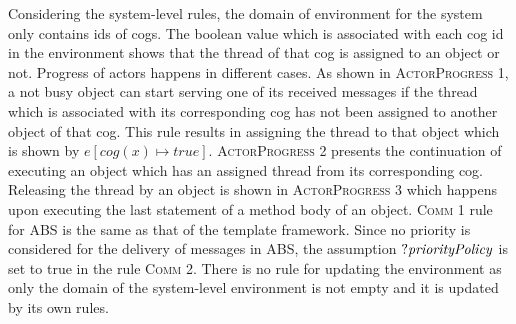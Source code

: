 Considering the system-level rules, the domain of environment for the system only contains ids of cogs. The boolean value which is associated with each cog id in the environment shows that the thread of that cog is assigned to an object or not.  Progress of actors happens in different cases. As shown in \textsc{ActorProgress 1}, a not busy object can start serving one of its received messages if the thread which is associated with its corresponding cog has not been assigned to another object of that cog. This rule results in assigning the thread to that object which is shown by $e[cog(x)\mapsto true]$. \textsc{ActorProgress 2} presents the continuation of executing an object which has an assigned thread from its corresponding cog. Releasing the thread by an object is shown in \textsc{ActorProgress 3} which happens upon executing the last statement of a method body of an object. \textsc{Comm 1} rule for ABS is the same as that of the template framework. Since no priority is considered for the delivery of messages in ABS, the assumption $?{\it priorityPolicy}$ is set to true in the rule \textsc{Comm 2}. There is no rule for updating the environment as only the domain of the system-level environment is not empty and it is updated by its own rules.


